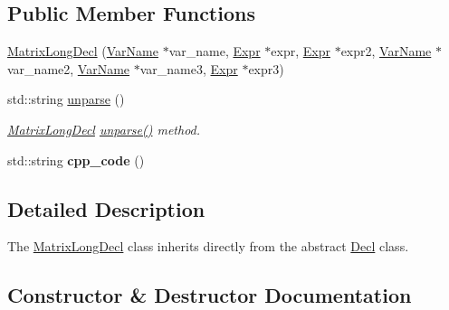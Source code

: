 \subsection*{Public Member Functions}
\begin{DoxyCompactItemize}
\item 
\hyperlink{classfcal_1_1ast_1_1MatrixLongDecl_a95cfff1523f2c6c7566303bf0fcfd615}{Matrix\+Long\+Decl} (\hyperlink{classfcal_1_1ast_1_1VarName}{Var\+Name} $\ast$var\+\_\+name, \hyperlink{classfcal_1_1ast_1_1Expr}{Expr} $\ast$expr, \hyperlink{classfcal_1_1ast_1_1Expr}{Expr} $\ast$expr2, \hyperlink{classfcal_1_1ast_1_1VarName}{Var\+Name} $\ast$var\+\_\+name2, \hyperlink{classfcal_1_1ast_1_1VarName}{Var\+Name} $\ast$var\+\_\+name3, \hyperlink{classfcal_1_1ast_1_1Expr}{Expr} $\ast$expr3)
\item 
std\+::string \hyperlink{classfcal_1_1ast_1_1MatrixLongDecl_addb5a0fd67a3468af9a5a512e268301e}{unparse} ()
\begin{DoxyCompactList}\small\item\em \hyperlink{classfcal_1_1ast_1_1MatrixLongDecl}{Matrix\+Long\+Decl} \hyperlink{classfcal_1_1ast_1_1MatrixLongDecl_addb5a0fd67a3468af9a5a512e268301e}{unparse()} method. \end{DoxyCompactList}\item 
std\+::string {\bfseries cpp\+\_\+code} ()\hypertarget{classfcal_1_1ast_1_1MatrixLongDecl_ab46f23586f9c5e38bd1959dd47a1e522}{}\label{classfcal_1_1ast_1_1MatrixLongDecl_ab46f23586f9c5e38bd1959dd47a1e522}

\end{DoxyCompactItemize}


\subsection{Detailed Description}
The \hyperlink{classfcal_1_1ast_1_1MatrixLongDecl}{Matrix\+Long\+Decl} class inherits directly from the abstract \hyperlink{classfcal_1_1ast_1_1Decl}{Decl} class. 

\subsection{Constructor \& Destructor Documentation}

